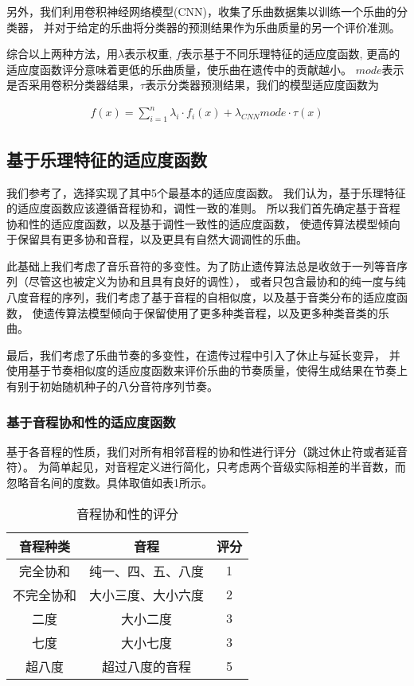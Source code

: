 \documentclass{article}
\begin{document}
另外，我们利用卷积神经网络模型(CNN)，收集了乐曲数据集以训练一个乐曲的分类器，
并对于给定的乐曲将分类器的预测结果作为乐曲质量的另一个评价准测。

综合以上两种方法，用$\lambda$表示权重, $f$表示基于不同乐理特征的适应度函数,
更高的适应度函数评分意味着更低的乐曲质量，使乐曲在遗传中的贡献越小。
$mode$表示是否采用卷积分类器结果，$\tau$表示分类器预测结果，我们的模型适应度函数为

\begin{align}
    f(x)=\sum_{i=1}^{n} \lambda_i \cdot f_i(x) + \lambda_{CNN} mode \cdot \tau(x)
\end{align}


\subsection{基于乐理特征的适应度函数}
我们参考了\cite{article1}\cite{article2}，选择实现了其中5个最基本的适应度函数。
我们认为，基于乐理特征的适应度函数应该遵循音程协和，调性一致的准则。
所以我们首先确定基于音程协和性的适应度函数，以及基于调性一致性的适应度函数，
使遗传算法模型倾向于保留具有更多协和音程，以及更具有自然大调调性的乐曲。

此基础上我们考虑了音乐音符的多变性。为了防止遗传算法总是收敛于一列等音序列（尽管这也被定义为协和且具有良好的调性），
或者只包含最协和的纯一度与纯八度音程的序列，我们考虑了基于音程的自相似度，以及基于音类分布的适应度函数，
使遗传算法模型倾向于保留使用了更多种类音程，以及更多种类音类的乐曲。

最后，我们考虑了乐曲节奏的多变性，在遗传过程中引入了休止与延长变异，
并使用基于节奏相似度的适应度函数来评价乐曲的节奏质量，使得生成结果在节奏上有别于初始随机种子的八分音符序列节奏。

\subsubsection{基于音程协和性的适应度函数}
基于各音程的性质，我们对所有相邻音程的协和性进行评分（跳过休止符或者延音符）。
为简单起见，对音程定义进行简化，只考虑两个音级实际相差的半音数，而忽略音名间的度数。具体取值如表1所示。

\begin{table}[htbp]
    \centering
    \caption{音程协和性的评分}
      \begin{tabular}{ccc}
      \toprule
      音程种类 & 音程 & 评分 \\
      \midrule
      完全协和 & 纯一、四、五、八度 & 1 \\
      不完全协和 & 大小三度、大小六度 & 2 \\
      二度 & 大小二度 & 3 \\
      七度 & 大小七度 & 3 \\
      超八度 & 超过八度的音程 & 5 \\
      \bottomrule
      \end{tabular}
  \end{table}%
\end{document}
